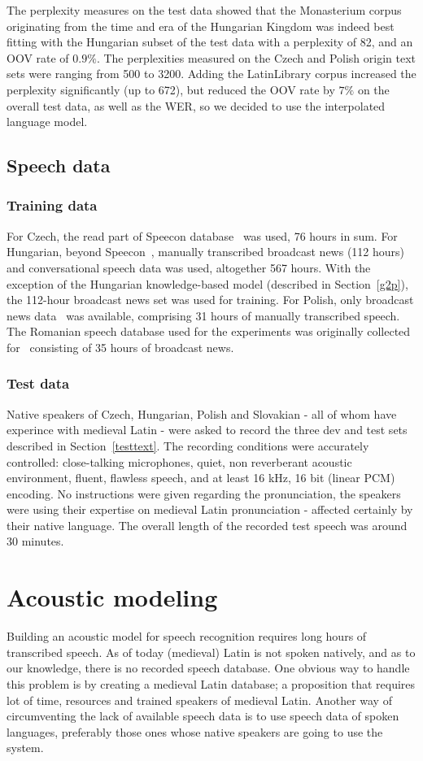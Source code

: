 \documentclass[runningheads,a4paper]{llncs}
\begin{document}
The perplexity measures on the test data showed that the Monasterium corpus originating from the time and era of the Hungarian Kingdom was indeed best fitting with the Hungarian subset of the test data with a perplexity of 82, and an OOV rate of $0.9\%$.
The perplexities measured on the Czech and Polish origin text sets were ranging from 500 to 3200.
Adding the LatinLibrary corpus increased the perplexity significantly (up to 672), but reduced the OOV rate by $7\%$ on the overall test data, as well as the WER, so we decided to use the interpolated language model.

\subsection{Speech data}
\subsubsection{Training data}\label{speechtraining}
For Czech, the read part of Speecon database~\cite{czech} was used, 76 hours in sum.
For Hungarian, beyond Speecon~\cite{hungarian}, manually transcribed broadcast news (112 hours) and conversational speech data was used, altogether 567 hours.
With the exception of the Hungarian knowledge-based model (described in Section~\ref{g2p}), the 112-hour broadcast news set was used for training.
For Polish, only broadcast news data~\cite{romanian} was available, comprising 31 hours of manually transcribed speech.
The Romanian speech database used for the experiments was originally collected for~\cite{romanian} consisting of 35 hours of broadcast news.
\subsubsection{Test data}
Native speakers of Czech, Hungarian, Polish and Slovakian - all of whom have experince with medieval Latin - were asked to record the three dev and test sets described in Section~\ref{testtext}.
The recording conditions were accurately controlled: close-talking microphones, quiet, non reverberant acoustic environment, fluent, flawless speech, and at least 16 kHz, 16 bit (linear PCM) encoding.
No instructions were given regarding the pronunciation, the speakers were using their expertise on medieval Latin pronunciation - affected certainly by their native language.
The overall length of the recorded test speech was around 30 minutes.

\section{Acoustic modeling}\label{AM}
Building an acoustic model for speech recognition requires long hours of transcribed speech.
As of today (medieval) Latin is not spoken natively, and as to our knowledge, there is no recorded speech database.
One obvious way to handle this problem is by creating a medieval Latin database; a proposition that requires lot of time, resources and trained speakers of medieval Latin. 
Another way of circumventing the lack of available speech data is to use speech data of spoken languages, preferably those ones whose native speakers are going to use the system. 
\end{document}
